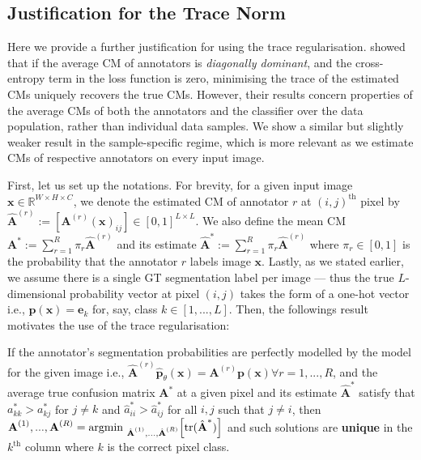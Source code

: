 \subsection{Justification for the Trace Norm}

Here we provide a further justification for using the trace regularisation. \cite{tanno2019learning} showed that if the average CM of annotators is \textit{diagonally dominant}, and the cross-entropy term in the loss function is zero, minimising the trace of the estimated CMs uniquely recovers the true CMs. However, their results concern properties of the average CMs of both the annotators and the classifier over the data population, rather than individual data samples. We show a similar but slightly weaker result in the sample-specific regime, which is more relevant as we estimate CMs of respective annotators on every input image. 

First, let us set up the notations. For brevity, for a given input image $\mathbf{x} \in \mathbb{R}^{W\times H \times C}$, we denote the estimated CM of annotator $r$ at $(i, j)^{\text{th}}$ pixel by $\hat{\textbf{A}}^{(r)} := [\textbf{A}^{(r)}(\mathbf{x})_{ij}] \in [0, 1]^{L\times L}$. We also define the mean CM $\textbf{A}^*:= \sum_{r=1}^R \pi_r\hat{\textbf{A}}^{(r)}$ and its estimate $\hat{\textbf{A}}^{*}:=\sum_{r=1}^R \pi_r \hat{\textbf{A}}^{(r)}$ where $\pi_r\in [0,1]$ is the probability that the annotator $r$ labels image $\mathbf{x}$. Lastly, as we stated earlier, we assume there is a single GT segmentation label per image --- thus the true $L$-dimensional probability vector at pixel $(i, j)$ takes the form of a one-hot vector i.e., $\textbf{p}(\textbf{x}) = \mathbf{e}_k$ for, say, class $k \in [1, ...,L]$.  Then, the followings result motivates the use of the trace regularisation: 

\begin{theorem}
If the annotator's segmentation probabilities are perfectly modelled by the model for the given image i.e., $\hat{\textbf{A}}^{(r)}\hat{\textbf{p}}_\theta(\textbf{x})=\textbf{A}^{(r)}\textbf{p}(\textbf{x}) \forall r=1,...,R$, and the average true confusion matrix $\textbf{A}^{*}$ at a given pixel and its estimate $\hat{\textbf{A}}^{*}$ satisfy that $a^*_{kk} > a^*_{kj}$ for $j \neq k$ and $\hat{a}^*_{ii} > \hat{a}^*_{ij}$ for all $i, j$ such that $j \neq i$, then  $\textbf{A}^{(1)}, ..., \textbf{A}^{(R)} = \text{argmin }_{\hat{\textbf{A}}^{(1)}, ..., \hat{\textbf{A}}^{(R)}}\Big{[}\text{tr}(\hat{\textbf{A}}^{*})\Big{]}$ and such solutions are \textbf{unique} in the $k^{\text{th}}$ column where $k$ is the correct pixel class.
\end{theorem}

